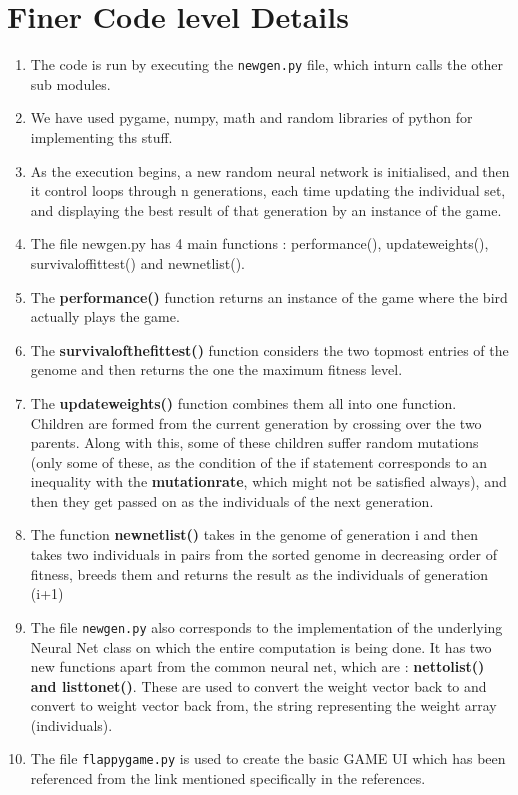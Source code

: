\documentclass{article}
\begin{document}
\section{Finer Code level Details}
\begin{enumerate}
    \item The code is run by executing the \texttt{newgen.py} file, which inturn calls the other sub modules.
    \item We have used pygame, numpy, math and random libraries of python for implementing ths stuff.
    \item As the execution begins, a new random neural network is initialised, and then it control loops through n generations, each time updating the individual set, and displaying the best result of that generation by an instance of the game.
    \item The file newgen.py has 4 main functions : performance(), updateweights(), survivaloffittest() and newnetlist(). 
    \item The \textbf{performance()} function returns an instance of the game where the bird actually plays the game.
    \item The \textbf{survivalofthefittest()} function considers the two topmost entries of the genome and then returns the one the maximum fitness level.
    \item The \textbf{updateweights()} function combines them all into one function. Children are formed from the current generation by crossing over the two parents. Along with this, some of these children suffer random mutations (only some of these, as the condition of the if statement corresponds to an inequality with the \textbf{mutationrate}, which might not be satisfied always), and then they get passed on as the individuals of the next generation.
    \item The function \textbf{newnetlist()} takes in the genome of generation i and then takes  two individuals in pairs from the sorted genome in decreasing order of fitness, breeds them and returns the result as the individuals of generation (i+1)
    \item The file \texttt{newgen.py} also corresponds to the implementation of the underlying Neural Net class on which the entire computation is being done. It has two new functions apart from the common neural net, which are : \textbf{nettolist() and listtonet()}. These are used to convert the weight vector back to and convert to weight vector back from, the string representing the weight array (individuals).
    \item The file \texttt{flappygame.py} is used to create the basic GAME UI which has been referenced from the link mentioned specifically in the references. 
\end{enumerate}
\end{document}
